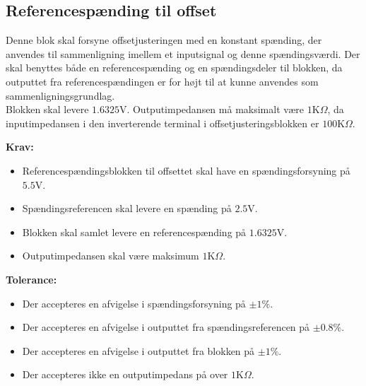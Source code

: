 \subsection{Referencespænding til offset}\label{Ref_Offset_Afs}
Denne blok skal forsyne offsetjusteringen med en konstant spænding, der anvendes til sammenligning imellem et inputsignal og denne spændingsværdi. Der skal benyttes både en referencespænding og en spændingsdeler til blokken, da outputtet fra referencespændingen er for højt til at kunne anvendes som sammenligningsgrundlag. \\
Blokken skal levere $1.6325$V. Outputimpedansen må maksimalt være $1$K$\Omega$, da inputimpedansen i den inverterende terminal i offsetjusteringsblokken er $100$K$\Omega$.

\noindent\textbf{Krav:}
\begin{itemize}
	\item Referencespændingsblokken til offsettet skal have en spændingsforsyning på $5.5$V.
	\item Spændingsreferencen skal levere en spænding på $2.5$V.
	\item Blokken skal samlet levere en referencespænding på $1.6325$V.
	\item Outputimpedansen skal være maksimum $1$K$\Omega$.
\end{itemize}
\noindent \textbf{Tolerance:}
\begin{itemize}
	\item Der accepteres en afvigelse i spændingsforsyning på $\pm1\%$.
	\item Der accepteres en afvigelse i outputtet fra spændingsreferencen på $\pm0.8\%$.
	\item Der accepteres en afvigelse i outputtet fra blokken på $\pm1\%$. 
	\item Der accepteres ikke en outputimpedans på over $1$K$\Omega$.
\end{itemize}
